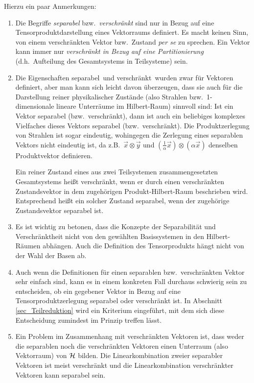 Hierzu ein paar Anmerkungen:
\begin{enumerate}
\item
Die Begriffe {\em separabel} bzw.\ {\em verschr\"ankt} sind
nur in Bezug auf eine Tensorproduktdarstellung eines Vektorraums
definiert. Es macht keinen Sinn, von einem verschr\"ankten Vektor bzw.\
Zustand {\em per se} zu sprechen. Ein Vektor kann immer nur
{\em verschr\"ankt in Bezug auf eine Partitionierung} (d.h.\ Auf\-teilung
des Gesamtsys\-tems in Teilsysteme) sein. 
\item
Die Eigenschaften \glqq separabel\grqq\ und \glqq verschr\"ankt\grqq\ wurden zwar f\"ur Vektoren
definiert, aber man kann sich leicht davon \"uberzeugen, dass sie
auch f\"ur die Darstellung reiner physikalischer Zust\"ande (also Strahlen bzw.\ 1-dimensionale
lineare Unterr\"aume im Hilbert-Raum) sinnvoll sind: Ist ein Vektor
separabel (bzw.\ verschr\"ankt), dann ist auch ein beliebiges komplexes
Vielfaches dieses Vektors separabel (bzw.\ verschr\"ankt). Die Produktzerlegung
von Strahlen ist sogar eindeutig, wohingegen die Zerlegung eines
separablen Vektors nicht eindeutig ist, da z.B.\ $\vec{x}\otimes \vec{y}$ und
$(\frac{1}{\alpha}\vec{x})\otimes(\alpha \vec{x})$ denselben Produktvektor
definieren.

Ein reiner Zustand eines aus zwei Teilsystemen zusammengesetzten Gesamtsystems
hei\ss t verschr\"ankt, wenn er durch einen verschr\"ankten Zustandsvektor
in dem zugeh\"origen Produkt-Hilbert-Raum beschrieben wird. Entsprechend hei\ss t
ein solcher Zustand separabel, wenn der zugeh\"orige Zustandsvektor separabel ist. 
\item
Es ist wichtig zu betonen, dass die Konzepte der Separabilit\"at
und Verschr\"ankt\-heit nicht von den gew\"ahlten Basissystemen 
in den Hilbert-R\"aumen
abh\"angen. Auch die Definition des Tensorprodukts h\"angt nicht 
von der Wahl der Basen ab.
\item
Auch wenn die Definitionen f\"ur einen separablen bzw.\ verschr\"ankten
Vektor sehr einfach sind,
kann es in einem konkreten Fall durchaus schwierig sein zu
entscheiden, ob ein gegebener Vektor in Bezug auf eine 
Tensorproduktzerlegung separabel oder verschr\"ankt
ist. In Abschnitt \ref{sec_Teilreduktion} wird ein Kriterium
eingef\"uhrt, mit dem sich diese Entscheidung 
zumindest im Prinzip treffen l\"asst.  
\item
Ein Problem im Zusammenhang mit verschr\"ankten Vektoren ist, dass
weder die separablen noch die verschr\"ankten Vektoren einen Unterraum
(also Vektorraum) von ${\cal H}$ bilden. Die Linearkombination zweier
separabler Vektoren ist meist verschr\"ankt und die Linearkombination
verschr\"ankter Vektoren kann separabel sein. 
\end{enumerate}

